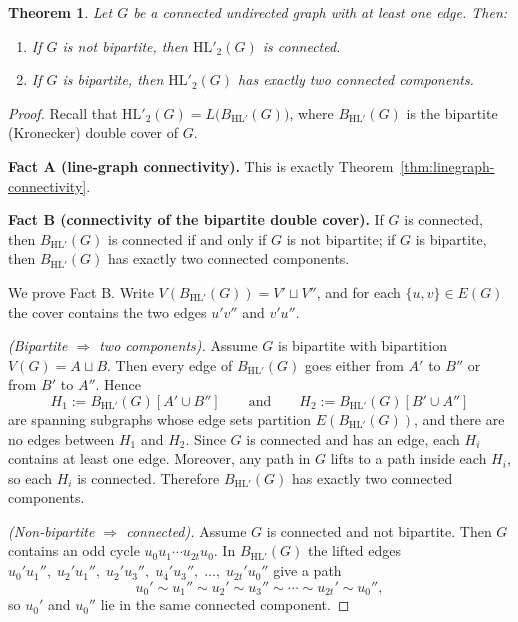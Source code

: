 \documentclass[11pt]{article}
\newtheorem{theorem}{Theorem}
\newcommand{\HL}{\mathrm{HL}}
\theoremstyle{plain}
\begin{document}
\begin{theorem}\label{thm:symmetric-connectedness}
Let \(G\) be a connected undirected graph with at least one edge. Then:
\begin{enumerate}
  \item If \(G\) is not bipartite, then \(\HL'_2(G)\) is connected.
  \item If \(G\) is bipartite, then \(\HL'_2(G)\) has exactly two connected components.
\end{enumerate}
\end{theorem}
\begin{proof}
Recall that \(\HL'_2(G)=L\!\big(B_{\HL'}(G)\big)\), where \(B_{\HL'}(G)\) is the
bipartite (Kronecker) double cover of \(G\).


\noindent\textbf{Fact A (line-graph connectivity).}
This is exactly Theorem~\ref{thm:linegraph-connectivity}.


\medskip
\noindent\textbf{Fact B (connectivity of the bipartite double cover).}
If \(G\) is connected, then \(B_{\HL'}(G)\) is connected if and only if \(G\) is
not bipartite; if \(G\) is bipartite, then \(B_{\HL'}(G)\) has exactly two
connected components.

\smallskip
We prove Fact B. Write \(V(B_{\HL'}(G))=V'\sqcup V''\), and for each
\(\{u,v\}\in E(G)\) the cover contains the two edges \(u'v''\) and \(v'u''\).

\smallskip
\emph{(Bipartite \(\Rightarrow\) two components).}
Assume \(G\) is bipartite with bipartition \(V(G)=A\sqcup B\).
Then every edge of \(B_{\HL'}(G)\) goes either from \(A'\) to \(B''\) or from
\(B'\) to \(A''\). Hence
\[
H_1 := B_{\HL'}(G)[A'\cup B'']\qquad\text{and}\qquad
H_2 := B_{\HL'}(G)[B'\cup A'']
\]
are spanning subgraphs whose edge sets partition \(E(B_{\HL'}(G))\), and there
are no edges between \(H_1\) and \(H_2\). Since \(G\) is connected and has an
edge, each \(H_i\) contains at least one edge. Moreover, any path in \(G\)
lifts to a path inside each \(H_i\), so each \(H_i\) is connected. Therefore
\(B_{\HL'}(G)\) has exactly two connected components.

\smallskip
\emph{(Non-bipartite \(\Rightarrow\) connected).}
Assume \(G\) is connected and not bipartite. Then \(G\) contains an odd cycle
\(u_0u_1\cdots u_{2t}u_0\). In \(B_{\HL'}(G)\) the lifted edges
\(
u_0'u_1'',\;
u_2'u_1'',\;
u_2'u_3'',\;
u_4'u_3'',\;
\dots,\;
u_{2t}'u_0''
\)
give a path
\[
u_0' \sim u_1'' \sim u_2' \sim u_3'' \sim \cdots \sim u_{2t}' \sim u_0'',
\]
so \(u_0'\) and \(u_0''\) lie in the same connected component.


\end{proof}
\end{document}
